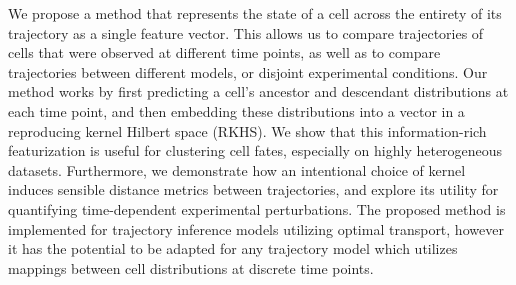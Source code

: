 We propose a method that represents the state of a cell across the entirety of its trajectory as a single feature vector. This allows us to compare trajectories of cells that were observed at different time points, as well as to compare trajectories between different models, or disjoint experimental conditions. Our method works by first predicting a cell's ancestor and descendant distributions at each time point, and then embedding these distributions into a vector in a reproducing kernel Hilbert space (RKHS). We show that this information-rich featurization is useful for clustering cell fates, especially on highly heterogeneous datasets. Furthermore, we demonstrate how an intentional choice of kernel induces sensible distance metrics between trajectories, and explore its utility for quantifying time-dependent experimental perturbations. The proposed method is implemented for trajectory inference models utilizing optimal transport, however it has the potential to be adapted for any trajectory model which utilizes mappings between cell distributions at discrete time points.

